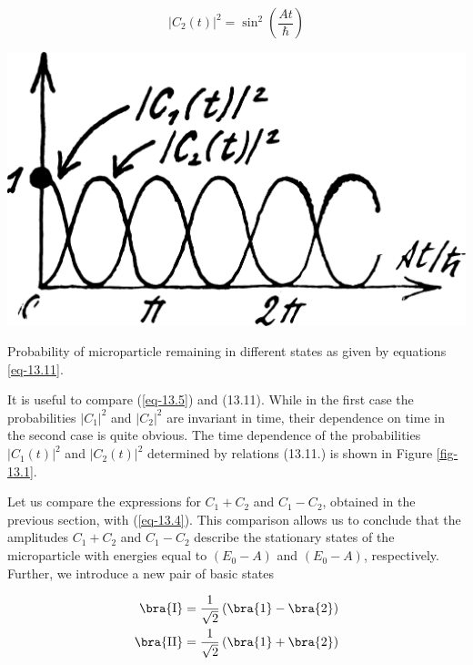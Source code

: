 \documentclass[a4paper,sfsidenotes,colorlinks=true]{tufte-book}
\numberwithin{equation}{section}
\numberwithin{figure}{section}
\begin{document}
\begin{description}
\begin{equation}%
|C_{2} (t)|^{2} = \sin^{2} \left( \frac{At}{\hbar} \right) 
\tag{13.11b} 
\label{eq-13.11}
\end{equation}



\begin{marginfigure}%
\centering
\includegraphics[width=\textwidth]{figures/fig-13-01.pdf}
\caption{Probability of microparticle remaining in different states as
given by equations \ref{eq-13.11}.}
\label{fig-13.1}
\end{marginfigure}

It is useful to compare (\ref{eq-13.5}) and (13.11). While in the first case the probabilities $|C_{1}|^{2}$ and  $|C_{2}|^{2}$ are invariant in time, their
dependence on time in the second case is quite obvious. The time
dependence of the probabilities  $|C_{1}(t)|^{2}$ and  $|C_{2}(t)|^{2}$
determined by relations (13.11.) is shown in Figure \ref{fig-13.1}.
\end{description}

Let us compare
the expressions for $C_{1} +C_{2}$ and $C_{1} - C_{2}$, obtained in
the previous section, with (\ref{eq-13.4}). This comparison allows us to
conclude that the amplitudes $C_{1} +C_{2}$ and $C_{1} - C_{2}$ describe the
stationary states of the microparticle with energies equal to $(E_{0} - A)$
and $(E_{0} - A)$, respectively. Further, we introduce a new pair of basic
states
\addtocounter{equation}{3}
\begin{equation}
\begin{split}
\bra{\mathrm{I}} & = \frac{1}{\sqrt{2}} \left( \bra{1} - \bra{2} \right)\\
\bra{\mathrm{II}} & = \frac{1}{\sqrt{2}} \left( \bra{1} + \bra{2} \right)
\end{split}
\label{eq-13.12}
\end{equation}
\end{document}

